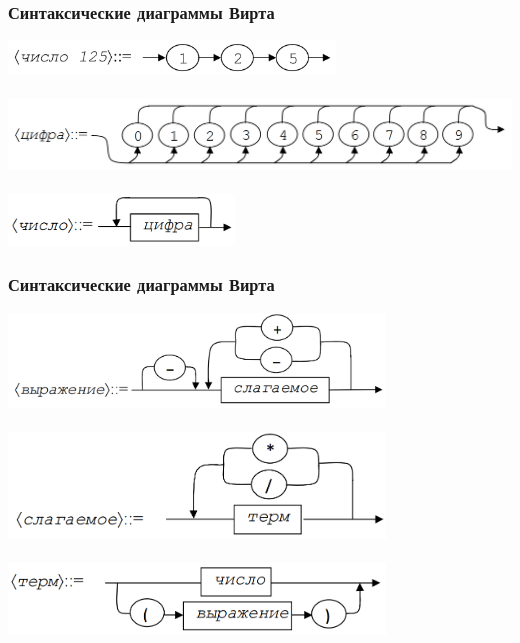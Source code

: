 \documentclass{beamer}
\begin{document}
\begin{frame}[fragile]
  \transwipe[direction=90]
  \frametitle{Синтаксические диаграммы Вирта}
\begin{center}
  \includegraphics[width=0.65\textwidth]{pics/sdseq.png}  \\~\\     \pause
  \includegraphics[width=1.0\textwidth]{pics/sddig.png}  \\~\\  \pause   
  \includegraphics[width=0.45\textwidth]{pics/sdnum.png}  
\end{center}
\end{frame}


\begin{frame}[fragile]
  \transwipe[direction=90]
  \frametitle{Синтаксические диаграммы Вирта}
\begin{center}
  \includegraphics[width=0.75\textwidth]{pics/sdexpr.png}  \\~\\     \pause
  \includegraphics[width=0.75\textwidth]{pics/sdfact.png}  \\~\\  \pause   
  \includegraphics[width=0.75\textwidth]{pics/sdterm.png}  
\end{center}
\end{frame}
\end{document}
